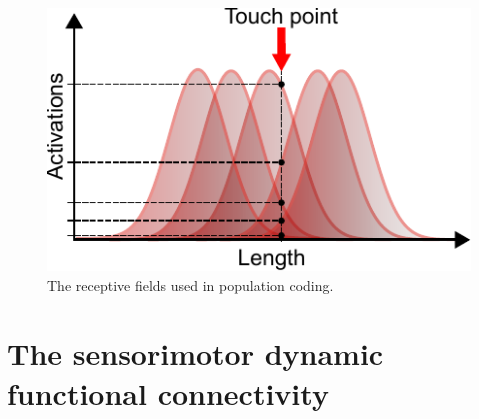 \begin{figure}[!t]
	\begin{center}
		\hspace*{\fill}
		\includegraphics[width=0.99\columnwidth]{pop_coding_sketch.pdf}
		\hspace*{\fill}
	\end{center}
	\caption{\label{fig:population_coding} The receptive fields used in population coding.}
\end{figure}
\section{The sensorimotor dynamic functional connectivity}

